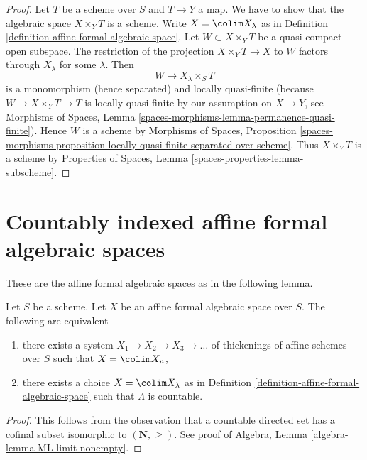 \begin{proof}
Let $T$ be a scheme over $S$ and $T \to Y$ a map. We have to show that
the algebraic space $X \times_Y T$ is a scheme. Write $X = \colim X_\lambda$
as in Definition
\ref{definition-affine-formal-algebraic-space}.
Let $W \subset X \times_Y T$
be a quasi-compact open subspace. The restriction of the projection
$X \times_Y T \to X$ to $W$ factors through $X_\lambda$ for some $\lambda$.
Then
$$
W \to X_\lambda \times_S T
$$
is a monomorphism (hence separated) and locally quasi-finite (because
$W \to X \times_Y T \to T$ is locally quasi-finite by our assumption
on $X \to Y$, see Morphisms of Spaces, Lemma
\ref{spaces-morphisms-lemma-permanence-quasi-finite}).
Hence $W$ is a scheme by
Morphisms of Spaces, Proposition
\ref{spaces-morphisms-proposition-locally-quasi-finite-separated-over-scheme}.
Thus $X \times_Y T$ is a scheme by
Properties of Spaces, Lemma \ref{spaces-properties-lemma-subscheme}.
\end{proof}






\section{Countably indexed affine formal algebraic spaces}
\label{section-countably-indexed}

\noindent
These are the affine formal algebraic spaces as in the following lemma.

\begin{lemma}
\label{lemma-countable-affine-formal-algebraic-space}
Let $S$ be a scheme. Let $X$ be an affine formal algebraic space over $S$.
The following are equivalent
\begin{enumerate}
\item there exists a system $X_1 \to X_2 \to X_3 \to \ldots$
of thickenings of affine schemes over $S$ such that $X = \colim X_n$,
\item there exists a choice $X = \colim X_\lambda$ as in
Definition \ref{definition-affine-formal-algebraic-space}
such that $\Lambda$ is countable.
\end{enumerate}
\end{lemma}

\begin{proof}
This follows from the observation that a countable directed set
has a cofinal subset isomorphic to $(\mathbf{N}, \geq)$.
See proof of Algebra, Lemma \ref{algebra-lemma-ML-limit-nonempty}.
\end{proof}

